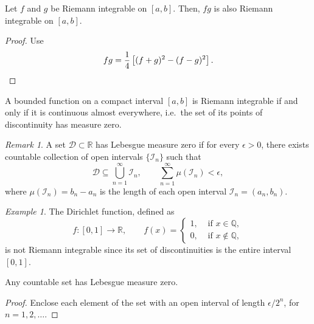 \documentclass[11pt]{article}
\def\R{\mathbb{R}}
\def\Q{\mathbb{Q}}
\theoremstyle{definition}
\theoremstyle{remark}
\newtheorem*{remark}{Remark}
\newtheorem*{example}{Example}
\numberwithin{equation}{module}
\begin{document}
    \begin{corollary}
        Let $f$ and $g$ be Riemann integrable on $[a, b]$. Then, $fg$ is also
        Riemann integrable on $[a, b]$.
    \end{corollary}
    \begin{proof}
        Use \[
            fg = \frac{1}{4}\left[(f + g)^2 - (f - g)^2\right]. \qedhere
        \] 
    \end{proof}

    \begin{theorem}
        A bounded function on a compact interval $[a, b]$ is Riemann integrable if
        and only if it is continuous almost everywhere, i.e.\ the set of its points
        of discontinuity has measure zero.

        \begin{remark}
            A set $\mathscr{D} \subset \R$ has Lebesgue measure zero if for every
            $\epsilon > 0$, there exists countable collection of open intervals
            $\{\mathscr{I}_n\}$ such that \[
                \mathscr{D} \subseteq \bigcup_{n = 1}^\infty \mathscr{I}_n, \qquad
                \sum_{n = 1}^\infty \mu(\mathscr{I}_n) < \epsilon,
            \] where $\mu(\mathscr{I}_n) = b_n - a_n$ is the length of each open
            interval $\mathscr{I}_n = (a_n, b_n)$.
        \end{remark}
    \end{theorem}
    \begin{example}
        The Dirichlet function, defined as \[
            f\colon [0, 1] \to \R, \qquad f(x) = \begin{cases}
                1, &\text{ if }x \in \Q, \\
                0, &\text{ if }x \notin \Q,
            \end{cases}
        \] is not Riemann integrable since its set of discontinuities is the entire
        interval $[0, 1]$.
    \end{example}
    
    \begin{lemma}
        Any countable set has Lebesgue measure zero.
    \end{lemma}
    \begin{proof}
        Enclose each element of the set with an open interval of length $\epsilon /
        2^n$, for $n = 1, 2, \dots$.
    \end{proof}
\end{document}
